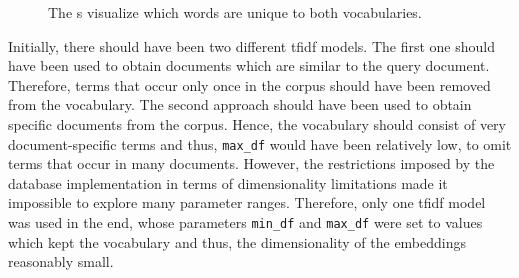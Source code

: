 \begin{figure}%
    \centering
    \qquad
    \caption[\wordcloud{}s for different \ac{tfidf} preprocessors]{The \wordcloud{}s visualize which words are unique to both vocabularies.}%
    \label{fig:differences-vocabularies}%
\end{figure}

Initially, there should have been two different \ac{tfidf} models.
The first one should have been used to obtain documents which are similar to the query document.
Therefore, terms that occur only once in the corpus should have been removed from the vocabulary.
The second approach should have been used to obtain specific documents from the corpus.
Hence, the vocabulary should consist of very document-specific terms and thus, \texttt{max\_df} would have been relatively low, to omit terms that occur in many documents.
However, the restrictions imposed by the database implementation in terms of dimensionality limitations
made it impossible to explore many parameter ranges.
Therefore, only one \ac{tfidf} model was used in the end, whose parameters \texttt{min\_df} and \texttt{max\_df} were set to values which kept the vocabulary and thus,
the dimensionality of the embeddings reasonably small.